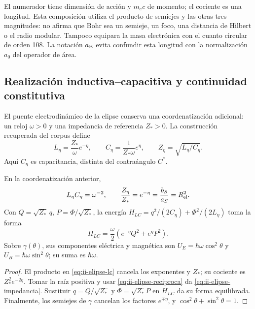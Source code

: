 El numerador tiene dimensión de acción y \(m_ec\) de momento; el
cociente es una longitud. Esta composición utiliza el producto de
semiejes y las otras tres magnitudes: no afirma que Bohr sea un semieje,
un foco, una distancia de Hilbert o el radio modular. Tampoco equipara
la masa electrónica con el cuanto circular de orden 108. La notación
\(a_{\rm B}\) evita confundir esta longitud con la normalización
\(a_0\) del operador de área.

\subsection{Realización inductiva--capacitiva y continuidad constitutiva}
\label{sec:ii-elipse-lc}

El puente electrodinámico de la elipse conserva una coordenatización adicional:
un reloj \(\omega>0\) y una impedancia de referencia \(Z_*>0\).
La construcción recuperada del corpus define
\begin{equation}
 L_\eta=\frac{Z_*}{\omega}e^{-\eta},\qquad
 C_\eta=\frac{1}{Z_*\omega}e^\eta,
 \qquad Z_\eta=\sqrt{L_\eta/C_\eta}.
 \label{eq:ii-elipse-lc}
\end{equation}
Aquí \(C_\eta\) es capacitancia, distinta del contraángulo \(C^*\).
\begin{proposition}
\label{prop:ii-elipse-lc}
En la coordenatización anterior,
\begin{equation}
 L_\eta C_\eta=\omega^{-2},\qquad
 \frac{Z_\eta}{Z_*}=e^{-\eta}
 =\frac{b_S}{a_S}=R_{\rm el}^{2}.
 \label{eq:ii-elipse-impedancia}
\end{equation}
Con \(Q=\sqrt{Z_*}\,q\), \(P=\Phi/\sqrt{Z_*}\), la energía
\(H_{LC}=q^2/(2C_\eta)+\Phi^2/(2L_\eta)\) toma la forma
\[
 H_{LC}=\frac\omega2(e^{-\eta}Q^2+e^\eta P^2).
\]
Sobre \(\gamma(\theta)\), sus componentes eléctrica y magnética son
\(U_E=\hbar\omega\cos^2\theta\) y
\(U_B=\hbar\omega\sin^2\theta\); su suma es \(\hbar\omega\).
\end{proposition}
\begin{proof}
El producto en \eqref{eq:ii-elipse-lc} cancela los exponentes y
\(Z_*\); su cociente es \(Z_*^2e^{-2\eta}\). Tomar la raíz
positiva y usar \eqref{eq:ii-elipse-reciproca} da
\eqref{eq:ii-elipse-impedancia}. Sustituir \(q=Q/\sqrt{Z_*}\)
y \(\Phi=\sqrt{Z_*}P\) en \(H_{LC}\) da su forma equilibrada.
Finalmente, los semiejes de \(\gamma\) cancelan los factores
\(e^{\mp\eta}\), y \(\cos^2\theta+\sin^2\theta=1\).
\end{proof}

